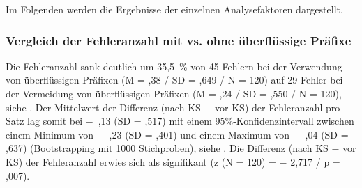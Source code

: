 
Im Folgenden werden die Ergebnisse der einzelnen Analysefaktoren dargestellt.

\subsubsection{\label{sec:5.3.8.1}Vergleich der Fehleranzahl mit vs. ohne überflüssige Präfixe}

Die Fehleranzahl sank deutlich um 35,5~\% von 45 Fehlern bei der Verwendung von überflüssigen Präfixen (M = ,38 / SD = ,649 / N = 120) auf 29 Fehler bei der Vermeidung von überflüssigen Präfixen (M = ,24 / SD = ,550 / N = 120), siehe . Der Mittelwert der Differenz (nach KS $-$ vor KS) der Fehleranzahl pro Satz lag somit bei $-$~,13 (SD = ,517) mit einem 95\%\nobreakdash-Konfidenzintervall zwischen einem Minimum von $-$~,23 (SD = ,401) und einem Maximum von $-$~,04 (SD = ,637) (Bootstrapping mit 1000 Stichproben), siehe . Die Differenz (nach KS $-$ vor KS) der Fehleranzahl erwies sich als signifikant (z (N = 120) = $-$ 2,717 / p = ,007).



